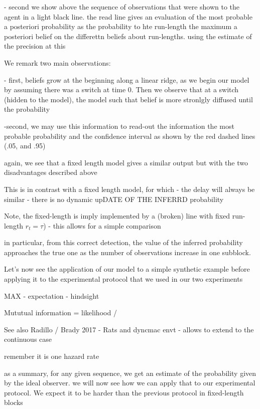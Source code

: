 \documentclass[profile,final,english,draft]{article}%
\begin{document}
- second we show above the sequence of observations that were shown to the agent in a light black line. the read line gives an evaluation of the most probable a posteriori probability as the probability to hte run-length the maximum a posteriori belief on the differettn beliefs about run-lengths. using the estimate of the precision at this

We remark two main observations:

- first, beliefs grow at the beginning along a linear ridge, as we begin our model by assuming there was a switch at time 0. Then we observe that at a switch (hidden to the model), the model
such that belief is more stronlgly diffused until the probability

-second, we may use this information to read-out the information the most probable probability and the confidence interval as shown by the red dashed lines (.05, and .95)

again, we see that a fixed length model gives a similar output
but with the two disadvantages described above

This is in contrast with a fixed length model, for which
- the delay will always be similar
- there is no dynamic upDATE OF THE INFERRD probability

Note, the fixed-length is imply implemented by a (broken) line with fixed run-length $r_t=\tau$) - this allows for a simple comparison


in particular, from this correct detection,
the value of the inferred probability approaches
the true one as the number of observations increase in one subblock.


Let's now see the application of our model to a simple synthetic example before applying it to the experimental protocol that we used in our two experiments

MAX - expectation - hindsight

Mututual information = likelihood /




See also Radillo / Brady 2017 - Rats and dyncmac envt - allows to extend to the continuous case


remember it is one hazard rate

as a summary, for any given sequence,
 we get an estimate of the probability given by the ideal observer.
 we will now see how we can apply that to our experimental protocol.
 We expect it to be harder than the previous protocol
 in fixed-length blocks
\end{document}
